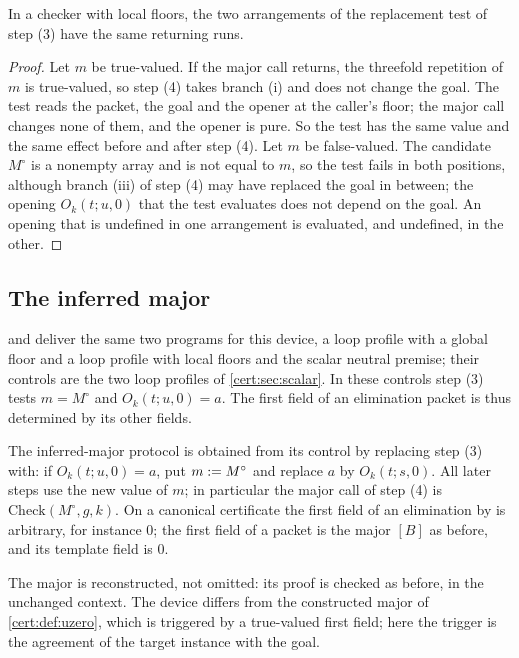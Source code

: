 \begin{lemma}\label{cert:lem:delayed}
In a checker with local floors, the two arrangements of the replacement test
of step (3) have the same returning runs.
\end{lemma}
\begin{proof}
Let $m$ be true-valued. If the major call returns, the threefold repetition of
$m$ is true-valued, so step (4) takes branch (i) and does not change the goal.
The test reads the packet, the goal and the opener at the caller's floor; the
major call changes none of them, and the opener is pure. So the test has the
same value and the same effect before and after step (4). Let $m$ be
false-valued. The candidate $M^{\circ}$ is a nonempty array and is not equal to
$m$, so the test fails in both positions, although branch (iii) of step (4)
may have replaced the goal in between; the opening $O_k(t;u,0)$ that the test
evaluates does not depend on the goal. An opening that is undefined in one
arrangement is evaluated, and undefined, in the other.
\end{proof}

\subsection{The inferred major}

 and  deliver the same two
programs for this device, a loop profile with a global floor and a loop
profile with local floors and the scalar neutral premise; their controls are
the two loop profiles of \cref{cert:sec:scalar}. In these controls step (3)
tests $m=M^{\circ}$ and $O_k(t;u,0)=a$. The first field of an elimination
packet is thus determined by its other fields.

\begin{definition}\label{cert:def:inferred}
The inferred-major protocol is obtained from its control by replacing step (3)
with: if $O_k(t;u,0)=a$, put $m\mathrel{:=} M^{\circ}$ and replace $a$ by
$O_k(t;s,0)$. All later steps use the new value of $m$; in particular the
major call of step (4) is $\mathrm{Check}(M^{\circ},g,k)$. On a canonical
certificate the first field of an elimination by  is arbitrary,
for instance $0$; the first field of a  packet is the major
$[B]$ as before, and its template field is $0$.
\end{definition}

The major is reconstructed, not omitted: its proof is checked as before, in
the unchanged context. The device differs from the constructed major of
\cref{cert:def:uzero}, which is triggered by a true-valued first field; here
the trigger is the agreement of the target instance with the goal.

